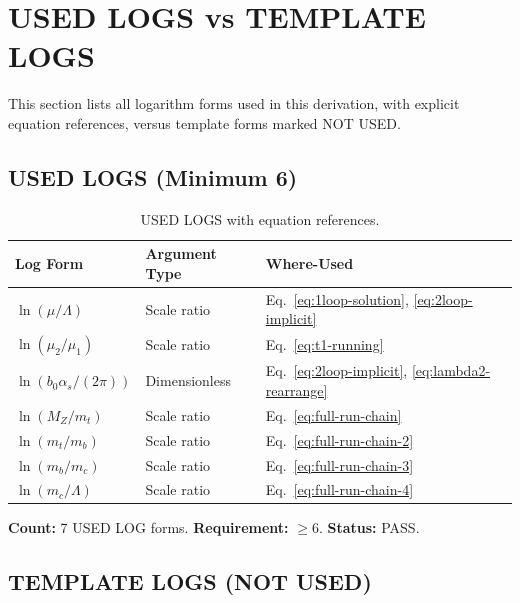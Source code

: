 \documentclass[11pt,a4paper]{article}
\theoremstyle{definition}
\begin{document}
\section{USED LOGS vs TEMPLATE LOGS}
\label{sec:log-hygiene}

\begin{loghygienebox}
This section lists all logarithm forms used in this derivation,
with explicit equation references, versus template forms marked NOT USED.
\end{loghygienebox}

\subsection{USED LOGS (Minimum 6)}
\label{subsec:used-logs}

\begin{table}[ht]
\centering
\caption{USED LOGS with equation references.}
\label{tab:used-logs}
\begin{tabular}{lll}
\toprule
Log Form & Argument Type & Where-Used \\
\midrule
$\ln(\mu/\Lambda)$ & Scale ratio & Eq.~\eqref{eq:1loop-solution}, \eqref{eq:2loop-implicit} \\
$\ln(\mu_2/\mu_1)$ & Scale ratio & Eq.~\eqref{eq:t1-running} \\
$\ln(b_0\alpha_s/(2\pi))$ & Dimensionless & Eq.~\eqref{eq:2loop-implicit}, \eqref{eq:lambda2-rearrange} \\
$\ln(M_Z/m_t)$ & Scale ratio & Eq.~\eqref{eq:full-run-chain} \\
$\ln(m_t/m_b)$ & Scale ratio & Eq.~\eqref{eq:full-run-chain-2} \\
$\ln(m_b/m_c)$ & Scale ratio & Eq.~\eqref{eq:full-run-chain-3} \\
$\ln(m_c/\Lambda)$ & Scale ratio & Eq.~\eqref{eq:full-run-chain-4} \\
\bottomrule
\end{tabular}
\end{table}

\textbf{Count:} 7 USED LOG forms. \textbf{Requirement:} $\geq 6$. \textbf{Status:} PASS.

\subsection{TEMPLATE LOGS (NOT USED)}
\label{subsec:template-logs}
\end{document}
